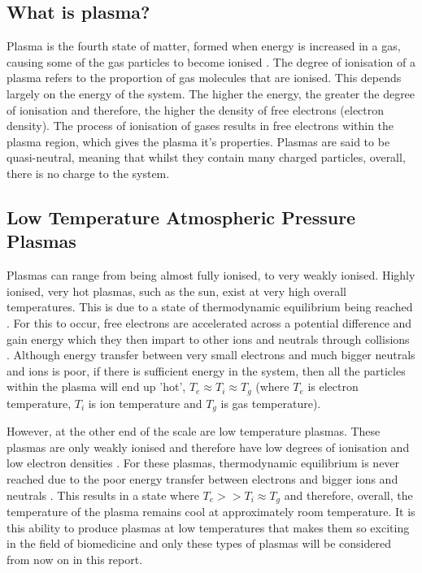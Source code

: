 \documentclass[11pt, oneside]{article}   	%
\begin{document}

\subsection{What is plasma?}
Plasma is the fourth state of matter, formed when energy is increased in a gas, causing some of the gas particles to become ionised \cite{Fridman2013PlasmaMedicine}. 
The degree of ionisation of a plasma refers to the proportion of gas molecules that are ionised.
This depends largely on the energy of the system. 
The higher the energy, the greater the degree of ionisation and therefore, the higher the density of free electrons (electron density).
The process of ionisation of gases results in free electrons within the plasma region, which gives the plasma it's properties.
Plasmas are said to be quasi-neutral, meaning that whilst they contain many charged particles, overall, there is no charge to the system.

\subsection{Low Temperature Atmospheric Pressure Plasmas} \label{section:LowTempPlasmas}

Plasmas can range from being almost fully ionised, to very weakly ionised.
Highly ionised, very hot plasmas, such as the sun, exist at very high overall temperatures. 
This is due to a state of thermodynamic equilibrium being reached \cite{Fridman2013PlasmaMedicine}. 
For this to occur, free electrons are accelerated across a potential difference and gain energy which they then impart to other ions and neutrals through collisions \cite{Hirst}.
Although energy transfer between very small electrons and much bigger neutrals and ions is poor, if there is sufficient energy in the system, then all the particles within the plasma will end up 'hot', $T_e \approx T_i \approx T_g$ (where $T_e$ is electron temperature, $T_i$ is ion temperature and $T_g$ is gas temperature).

However, at the other end of the scale are low temperature plasmas. 
These plasmas are only weakly ionised and therefore have low degrees of ionisation and low electron densities \cite{Fridman2013PlasmaMedicine}.
For these plasmas, thermodynamic equilibrium is never reached due to the poor energy transfer between electrons and bigger ions and neutrals \cite{Fridman2008}. 
This results in a state where $T_e >> T_i \approx T_g$ and therefore, overall, the temperature of the plasma remains cool at approximately room temperature.
It is this ability to produce plasmas at low temperatures that makes them so exciting in the field of biomedicine and only these types of plasmas will be considered from now on in this report.
\end{document}
